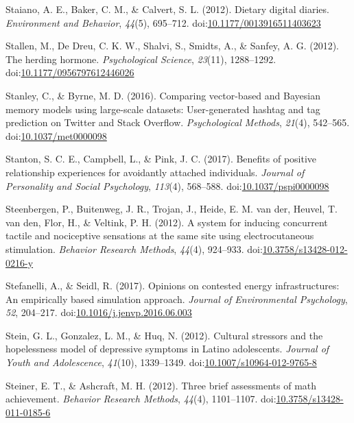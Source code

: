 \documentclass[english,man]{apa6}
\begin{document}
\hypertarget{ref-Staiano2012}{}
Staiano, A. E., Baker, C. M., \& Calvert, S. L. (2012). Dietary digital
diaries. \emph{Environment and Behavior}, \emph{44}(5), 695--712.
doi:\href{https://doi.org/10.1177/0013916511403623}{10.1177/0013916511403623}

\hypertarget{ref-Stallen2012}{}
Stallen, M., De Dreu, C. K. W., Shalvi, S., Smidts, A., \& Sanfey, A. G.
(2012). The herding hormone. \emph{Psychological Science},
\emph{23}(11), 1288--1292.
doi:\href{https://doi.org/10.1177/0956797612446026}{10.1177/0956797612446026}

\hypertarget{ref-Stanley2016}{}
Stanley, C., \& Byrne, M. D. (2016). Comparing vector-based and Bayesian
memory models using large-scale datasets: User-generated hashtag and tag
prediction on Twitter and Stack Overflow. \emph{Psychological Methods},
\emph{21}(4), 542--565.
doi:\href{https://doi.org/10.1037/met0000098}{10.1037/met0000098}

\hypertarget{ref-Stanton2017}{}
Stanton, S. C. E., Campbell, L., \& Pink, J. C. (2017). Benefits of
positive relationship experiences for avoidantly attached individuals.
\emph{Journal of Personality and Social Psychology}, \emph{113}(4),
568--588.
doi:\href{https://doi.org/10.1037/pspi0000098}{10.1037/pspi0000098}

\hypertarget{ref-Steenbergen2012}{}
Steenbergen, P., Buitenweg, J. R., Trojan, J., Heide, E. M. van der,
Heuvel, T. van den, Flor, H., \& Veltink, P. H. (2012). A system for
inducing concurrent tactile and nociceptive sensations at the same site
using electrocutaneous stimulation. \emph{Behavior Research Methods},
\emph{44}(4), 924--933.
doi:\href{https://doi.org/10.3758/s13428-012-0216-y}{10.3758/s13428-012-0216-y}

\hypertarget{ref-Stefanelli2017}{}
Stefanelli, A., \& Seidl, R. (2017). Opinions on contested energy
infrastructures: An empirically based simulation approach. \emph{Journal
of Environmental Psychology}, \emph{52}, 204--217.
doi:\href{https://doi.org/10.1016/j.jenvp.2016.06.003}{10.1016/j.jenvp.2016.06.003}

\hypertarget{ref-Stein2012}{}
Stein, G. L., Gonzalez, L. M., \& Huq, N. (2012). Cultural stressors and
the hopelessness model of depressive symptoms in Latino adolescents.
\emph{Journal of Youth and Adolescence}, \emph{41}(10), 1339--1349.
doi:\href{https://doi.org/10.1007/s10964-012-9765-8}{10.1007/s10964-012-9765-8}

\hypertarget{ref-Steiner2012}{}
Steiner, E. T., \& Ashcraft, M. H. (2012). Three brief assessments of
math achievement. \emph{Behavior Research Methods}, \emph{44}(4),
1101--1107.
doi:\href{https://doi.org/10.3758/s13428-011-0185-6}{10.3758/s13428-011-0185-6}
\end{document}
